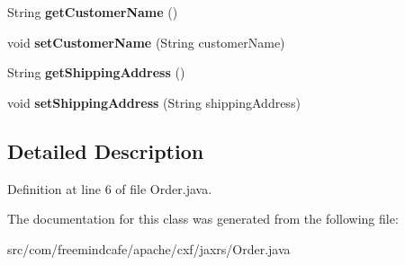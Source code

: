 \begin{DoxyCompactItemize}
\item 
\hypertarget{classcom_1_1freemindcafe_1_1apache_1_1cxf_1_1jaxrs_1_1_order_a409af1f80dd61ac2c56a4b569a037eb4}{}String {\bfseries get\+Customer\+Name} ()\label{classcom_1_1freemindcafe_1_1apache_1_1cxf_1_1jaxrs_1_1_order_a409af1f80dd61ac2c56a4b569a037eb4}

\item 
\hypertarget{classcom_1_1freemindcafe_1_1apache_1_1cxf_1_1jaxrs_1_1_order_ad1964a8b467b9c5a78fa49fdb355c4c2}{}void {\bfseries set\+Customer\+Name} (String customer\+Name)\label{classcom_1_1freemindcafe_1_1apache_1_1cxf_1_1jaxrs_1_1_order_ad1964a8b467b9c5a78fa49fdb355c4c2}

\item 
\hypertarget{classcom_1_1freemindcafe_1_1apache_1_1cxf_1_1jaxrs_1_1_order_a542e16ffa28e7e9a7160552ae2b132c1}{}String {\bfseries get\+Shipping\+Address} ()\label{classcom_1_1freemindcafe_1_1apache_1_1cxf_1_1jaxrs_1_1_order_a542e16ffa28e7e9a7160552ae2b132c1}

\item 
\hypertarget{classcom_1_1freemindcafe_1_1apache_1_1cxf_1_1jaxrs_1_1_order_ae5fd01cea531ec667622e8cdaf9e4153}{}void {\bfseries set\+Shipping\+Address} (String shipping\+Address)\label{classcom_1_1freemindcafe_1_1apache_1_1cxf_1_1jaxrs_1_1_order_ae5fd01cea531ec667622e8cdaf9e4153}

\end{DoxyCompactItemize}


\subsection{Detailed Description}


Definition at line 6 of file Order.\+java.



The documentation for this class was generated from the following file\+:\begin{DoxyCompactItemize}
\item 
src/com/freemindcafe/apache/cxf/jaxrs/Order.\+java\end{DoxyCompactItemize}
